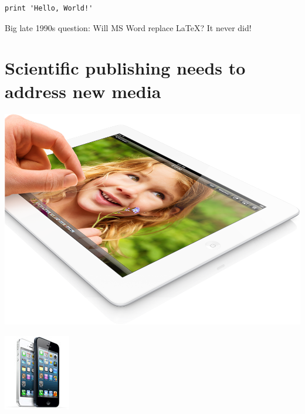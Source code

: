 \documentclass[%
twoside,                 %
draft,                   %
final,                   %
chapterprefix=true,      %
open=right               %
10pt]{book}
\begin{document}
\renewenvironment{shadedquoteBlue}[1][]{
\bgroup\rmfamily\fboxsep=0mm\relax
\begin{shadedskip}
\list{}{\parsep=-2mm\parskip=0mm\topsep=0pt\leftmargin=2mm
\rightmargin=2\leftmargin\leftmargin=4pt\relax}
\relax}{\endlist\end{shadedskip}\egroup}\begin{shadedquoteBlue}
\fontsize{9pt}{9pt}
\begin{Verbatim}
print 'Hello, World!'
\end{Verbatim}
\elatexcod

Big late 1990s question: Will MS Word replace {\LaTeX}? It never did!

\section*{Scientific publishing needs to address new media}


\begin{center}  %
  \centerline{\includegraphics[width=0.8\linewidth]{fig/ipad.png}}
\end{center}



\begin{center}  %
  \centerline{\includegraphics[width=0.3\linewidth]{fig/iphones.jpg}}
\end{center}



\end{shadedquoteBlue}
\end{document}
